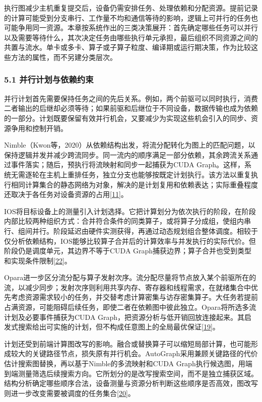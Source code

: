 \documentclass[UTF8,11pt,fontset=windows]{ctexart}
\begin{document}
执行图减少主机重复提交后，设备仍需安排任务、处理依赖和分配资源。提前记录的计算可能受到分支串行、工作量不均和通信等待的影响，逻辑上可并行的任务也可能争用同一资源。本章按系统作出的三类决策展开：首先确定哪些任务可以并行以及需要等待什么，其次决定任务由哪些执行单元承担，最后组织不同资源之间的共置与流水。单卡或多卡、算子或子算子粒度、编译期或运行期决策，作为比较这些方法的属性，而不另建分类层次。

\hypertarget{section-5-1}{%
\subsubsection{5.1 并行计划与依赖约束}\label{section-5-1}}

并行计划首先需要保持任务之间的先后关系。例如，两个前驱可以同时执行，消费二者输出的后继却必须等待；如果前驱和后继位于不同设备，数据传输也成为依赖的一部分。计划既要保留有效并行机会，又要减少为实现这些机会引入的同步、资源争用和控制开销。

Nimble（Kwon等，2020）从依赖结构出发，将流分配转化为图上的匹配问题，以保持逻辑并发并减少跨流同步。同一流内的顺序满足一部分依赖，其余跨流关系通过事件落实；随后，预执行将流映射和同步一起捕获为CUDA Graph。这样，系统无需逐轮在主机上重排任务，独立分支也能够按既定计划执行。该方法以重复执行相同计算集合的静态网络为对象，解决的是计划复用和依赖表达；实际重叠程度还取决于各任务对设备资源的占用\protect\hyperlink{ref-11}{{[}11{]}}。

IOS将目标设备上的测量引入计划选择。它把计算划分为依次执行的阶段，在阶段内部比较两种组织方式：合并符合条件的同类算子，或将算子分成组，使组内串行、组间并行。阶段延迟由硬件实测获得，再通过动态规划组合整体调度。相较于仅分析依赖结构，IOS能够比较算子合并后的计算效率与并发执行的实际代价。但阶段仍是调度单元，其边界不等于CUDA Graph捕获边界；算子合并也受到类型和实现条件限制\protect\hyperlink{ref-22}{{[}22{]}}。

Opara进一步区分流分配与算子发射次序。流分配尽量将节点放入某个前驱所在的流，以减少同步；发射次序则利用共享内存、寄存器和线程需求，在就绪集合中优先考虑资源需求较小的任务，并交替考虑计算密集与访存密集算子。大任务若提前占满资源，可能阻碍后续任务，即使二者在依赖图中彼此独立。Opara将所选多流计划及必要事件捕获为CUDA Graph，把资源分析与低开销回放连接起来。其启发式搜索给出可实施的计划，但不构成任意图上的全局最优保证\protect\hyperlink{ref-19}{{[}19{]}}。

计划还受到前端计算图改写的影响。融合或替换算子可以缩短局部计算，也可能形成较大的关键路径节点，损失原有并行机会。AutoGraph采用兼顾关键路径的代价估计搜索图替换，再以基于Nimble的多流映射和CUDA Graph执行候选图，用端到端测量筛选后续搜索方向。它所划分的是改写搜索空间，而不是独立捕获区域。结构分析确定哪些顺序合法，设备测量与资源分析判断这些顺序是否高效，图改写则进一步改变需要被调度的任务集合\protect\hyperlink{ref-20}{{[}20{]}}。
\end{document}
